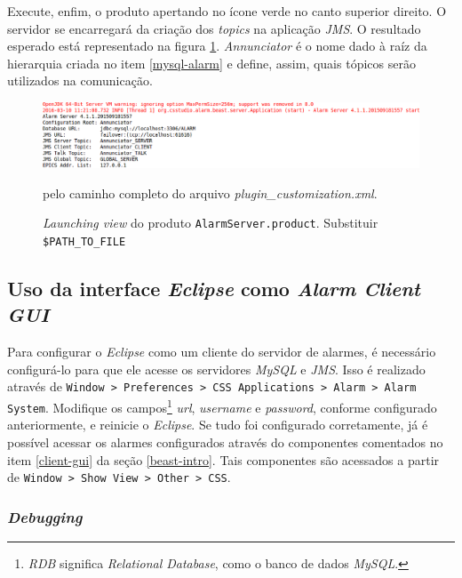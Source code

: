 \begin{enumerate}[i.]
\FloatBarrier

Execute, enfim, o produto apertando no ícone verde no canto superior direito.
O servidor se encarregará da criação dos \textit{topics} na aplicação
\textit{JMS}. O resultado esperado está representado na figura
\ref{fig:server-on}. \textit{Annunciator} é o nome dado à raíz da hierarquia
criada no item \ref{mysql-alarm} e define, assim, quais tópicos serão
utilizados na comunicação.

\FloatBarrier

\begin{figure}[h]

\centering
\includegraphics[scale=0.45]{image/alarmserver-on}
\caption {\textit{Launching view} do produto \texttt{AlarmServer.product}.
Substituir \texttt{\$PATH\_TO\_FILE}} pelo caminho completo do arquivo
\textit{plugin\_customization.xml}.
\label{fig:server-on} 
\end{figure}

\FloatBarrier

\end{enumerate}

\subsection{Uso da interface \textit{Eclipse} como \textit{Alarm Client GUI}}

Para configurar o \textit{Eclipse} como um cliente do servidor de alarmes, é
necessário configurá-lo para que ele acesse os servidores \textit{MySQL} e
\textit{JMS}. Isso é realizado através de \texttt{Window > Preferences > CSS
Applications > Alarm > Alarm System}. Modifique os campos\footnote{\textit{RDB}
significa \textit{Relational Database}, como o banco de dados \textit{MySQL}.}
\textit{url}, \textit{username} e \textit{password}, conforme configurado
anteriormente, e reinicie o \textit{Eclipse}. Se tudo foi configurado
corretamente, já é possível acessar os alarmes configurados através do
componentes comentados no item \ref{client-gui} da seção \ref{beast-intro}. Tais
componentes são acessados a partir de \texttt{Window > Show View > Other > CSS}.


\subsubsection {\textit{Debugging}} 

